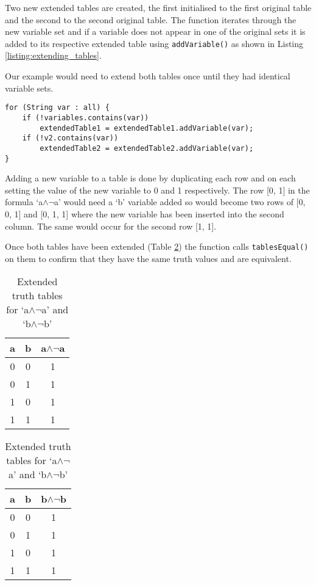 \documentclass{report}
\begin{document}
Two new extended tables are created, the first initialised to the first original table and the second to the second original table. The function iterates through the new variable set and if a variable does not appear in one of the original sets it is added to its respective extended table using {\tt addVariable()} as shown in Listing \ref{listing:extending_tables}. 

Our example would need to extend both tables once until they had identical variable sets.

\begin{listing}[ht]
\begin{verbatim} 
for (String var : all) {
    if (!variables.contains(var))
        extendedTable1 = extendedTable1.addVariable(var);
    if (!v2.contains(var))
        extendedTable2 = extendedTable2.addVariable(var);
}
\end{verbatim}
\caption{Extending the tables by adding new variables}
\label{listing:extending_tables}
\end{listing}

Adding a new variable to a table is done by duplicating each row and on each setting the value of the new variable to 0 and 1 respectively. The row [0, 1] in the formula `a$\land\lnot$a' would need a `b' variable added so would become two rows of [0, 0, 1] and [0, 1, 1] where the new variable has been inserted into the second column. The same would occur for the second row [1, 1].

Once both tables have been extended (Table \ref{table:extended_a_and_not_a}) the function calls {\tt tablesEqual()} on them to confirm that they have the same truth values and are equivalent.

\begin{table}[h]
  \begin{center}
\begin{tabular}{ || c | c || c || }
      \hline
      a & b & a$\land\lnot$a \\ \hline
      0 & 0 & 1 \\
      0 & 1 & 1 \\
      1 & 0 & 1 \\
      1 & 1 & 1 \\
      \hline
\end{tabular}
\hspace{15mm}
\begin{tabular}{ || c | c || c || }
      \hline
      a & b & b$\land\lnot$b \\ \hline
      0 & 0 & 1 \\
      0 & 1 & 1 \\
      1 & 0 & 1 \\
      1 & 1 & 1 \\
      \hline
\end{tabular}
  \end{center}
  \caption{Extended truth tables for `a$\land\lnot$a' and `b$\land\lnot$b'}
  \label{table:extended_a_and_not_a}
\end{table}
\end{document}
